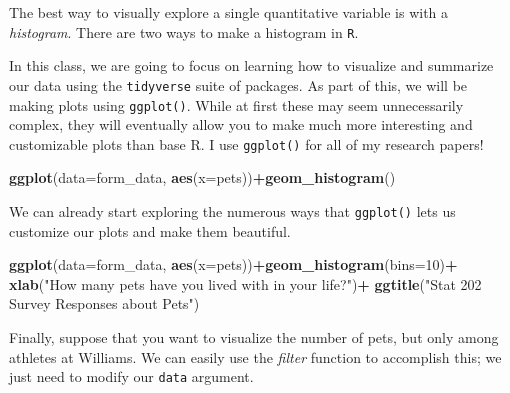 \documentclass[
]{article}
\newenvironment{Shaded}{\begin{snugshade}}{\end{snugshade}}
\newcommand{\AttributeTok}[1]{\textcolor[rgb]{0.13,0.29,0.53}{#1}}
\newcommand{\DecValTok}[1]{\textcolor[rgb]{0.00,0.00,0.81}{#1}}
\newcommand{\FunctionTok}[1]{\textcolor[rgb]{0.13,0.29,0.53}{\textbf{#1}}}
\newcommand{\NormalTok}[1]{#1}
\newcommand{\SpecialCharTok}[1]{\textcolor[rgb]{0.81,0.36,0.00}{\textbf{#1}}}
\newcommand{\StringTok}[1]{\textcolor[rgb]{0.31,0.60,0.02}{#1}}
\begin{document}
The best way to visually explore a single quantitative variable is with
a \emph{histogram}. There are two ways to make a histogram in
\texttt{R}.

\begin{Shaded}
\end{Shaded}

In this class, we are going to focus on learning how to visualize and
summarize our data using the \texttt{tidyverse} suite of packages. As
part of this, we will be making plots using \texttt{ggplot()}. While at
first these may seem unnecessarily complex, they will eventually allow
you to make much more interesting and customizable plots than base R. I
use \texttt{ggplot()} for all of my research papers!

\begin{Shaded}
\begin{Highlighting}[]
\FunctionTok{ggplot}\NormalTok{(}\AttributeTok{data=}\NormalTok{form\_data, }\FunctionTok{aes}\NormalTok{(}\AttributeTok{x=}\NormalTok{pets))}\SpecialCharTok{+}\FunctionTok{geom\_histogram}\NormalTok{()}
\end{Highlighting}
\end{Shaded}

We can already start exploring the numerous ways that \texttt{ggplot()}
lets us customize our plots and make them beautiful.

\begin{Shaded}
\begin{Highlighting}[]
\FunctionTok{ggplot}\NormalTok{(}\AttributeTok{data=}\NormalTok{form\_data, }\FunctionTok{aes}\NormalTok{(}\AttributeTok{x=}\NormalTok{pets))}\SpecialCharTok{+}\FunctionTok{geom\_histogram}\NormalTok{(}\AttributeTok{bins=}\DecValTok{10}\NormalTok{)}\SpecialCharTok{+}
  \FunctionTok{xlab}\NormalTok{(}\StringTok{"How many pets have you lived with in your life?"}\NormalTok{)}\SpecialCharTok{+}
  \FunctionTok{ggtitle}\NormalTok{(}\StringTok{"Stat 202 Survey Responses about Pets"}\NormalTok{)}
\end{Highlighting}
\end{Shaded}

Finally, suppose that you want to visualize the number of pets, but only
among athletes at Williams. We can easily use the \emph{filter} function
to accomplish this; we just need to modify our \texttt{data} argument.
\end{document}

